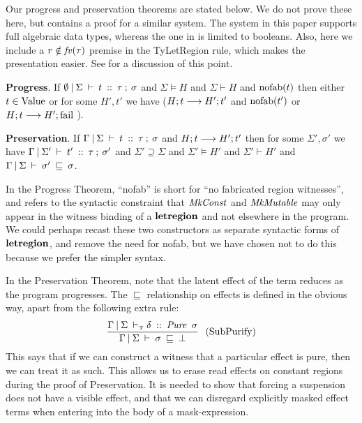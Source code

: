 Our progress and preservation theorems are stated below. We do not prove these here, but \cite{lippmeier:impure-world} contains a proof for a similar system. The system in this paper supports full algebraic data types, whereas the one in \cite{lippmeier:impure-world} is limited to booleans. Also, here we include a $r \notin \operatorname{\mathit{fv}}(\tau)$ premise in the TyLetRegion rule, which makes the presentation easier. See \cite{lippmeier:impure-world} for a discussion of this point.

\medskip
\textbf{Progress}. If $\emptyset \: \arrowvert \: \Sigma \: \vdash \: t \: :: \: \tau \: ; \: \sigma$ and $\Sigma \models H$ and $\Sigma \vdash H$ and $\textrm{nofab}(t)$ then either $t \in \textrm{Value}$ or for some $H', t'$ we have ($H ; t \longrightarrow H' ; t'$ and $\textrm{nofab}(t')$ or $H ; t \longrightarrow H' ; \textrm{fail}$ ).

\medskip
\textbf{Preservation}. If $\Gamma \: \arrowvert \: \Sigma \: \vdash \: t \: :: \: \tau \: ; \: \sigma$ and $H ; t \longrightarrow H' ; t'$ then for some $\Sigma', \sigma'$ we have $\Gamma \: \arrowvert \: \Sigma' \: \vdash \: t' \: :: \: \tau \: ; \: \sigma'$ and $\Sigma' \supseteq \Sigma$ and $\Sigma' \models H'$ and $\Sigma' \vdash H'$ and $\Gamma \: \arrowvert \: \Sigma \: \vdash \: \sigma' \: \sqsubseteq \: \sigma$.

\medskip
In the Progress Theorem, ``nofab'' is short for ``no fabricated region witnesses'', and refers to the syntactic constraint that $\operatorname{\mathit{MkConst}}$ and $\operatorname{\mathit{MkMutable}}$ may only appear in the witness binding of a $\textrm{\textbf{letregion}}$ and not elsewhere in the program. We could perhaps recast these two constructors as separate syntactic forms of $\textrm{\textbf{letregion}}$, and remove the need for nofab, but we have chosen not to do this because we prefer the simpler syntax. 

In the Preservation Theorem, note that the latent effect of the term reduces as the program progresses. The $\sqsubseteq$ relationship on effects is defined in the obvious way, apart from the following extra rule:
$$
	\frac	{ \Gamma \: \arrowvert \: \Sigma \: \vdash_\textrm{\tiny{T}}\delta \: :: \: \operatorname{\mathit{Pure}} \ \sigma }
		{ \Gamma \: \arrowvert \: \Sigma \: \vdash \: \sigma \: \sqsubseteq \: \bot }
		\ \textrm{\ (SubPurify)}
$$
This says that if we can construct a witness that a particular effect is pure, then we can treat it as such. This allows us to erase read effects on constant regions during the proof of Preservation. It is needed to show that forcing a suspension does not have a visible effect, and that we can disregard explicitly masked effect terms when entering into the body of a mask-expression.


